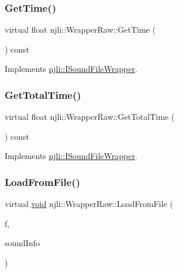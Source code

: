 \mbox{\label{classnjli_1_1_wrapper_raw_a1b236f8ef4b7bffe5b5a68d29c855cf3}} 
\subsubsection{\texorpdfstring{Get\+Time()}{GetTime()}}
{\footnotesize\ttfamily virtual float njli\+::\+Wrapper\+Raw\+::\+Get\+Time (\begin{DoxyParamCaption}{ }\end{DoxyParamCaption}) const\hspace{0.3cm}{\ttfamily [virtual]}}



Implements \mbox{\hyperlink{classnjli_1_1_i_sound_file_wrapper_afefb180620c4a6e17e994a867726eb29}{njli\+::\+I\+Sound\+File\+Wrapper}}.

\mbox{\label{classnjli_1_1_wrapper_raw_a2aa8be2aa5e292b3375c1a92f007592c}} 
\subsubsection{\texorpdfstring{Get\+Total\+Time()}{GetTotalTime()}}
{\footnotesize\ttfamily virtual float njli\+::\+Wrapper\+Raw\+::\+Get\+Total\+Time (\begin{DoxyParamCaption}{ }\end{DoxyParamCaption}) const\hspace{0.3cm}{\ttfamily [virtual]}}



Implements \mbox{\hyperlink{classnjli_1_1_i_sound_file_wrapper_a1b22318560969f7cc06ac03dcb78971f}{njli\+::\+I\+Sound\+File\+Wrapper}}.

\mbox{\label{classnjli_1_1_wrapper_raw_a9286adcc339118eac5d143ad73b646a7}} 
\subsubsection{\texorpdfstring{Load\+From\+File()}{LoadFromFile()}}
{\footnotesize\ttfamily virtual \mbox{\hyperlink{_thread_8h_af1e856da2e658414cb2456cb6f7ebc66}{void}} njli\+::\+Wrapper\+Raw\+::\+Load\+From\+File (\begin{DoxyParamCaption}\item[{F\+I\+LE $\ast$}]{f,  }\item[{Sound\+Info $\ast$}]{sound\+Info }\end{DoxyParamCaption})\hspace{0.3cm}{\ttfamily [virtual]}}



